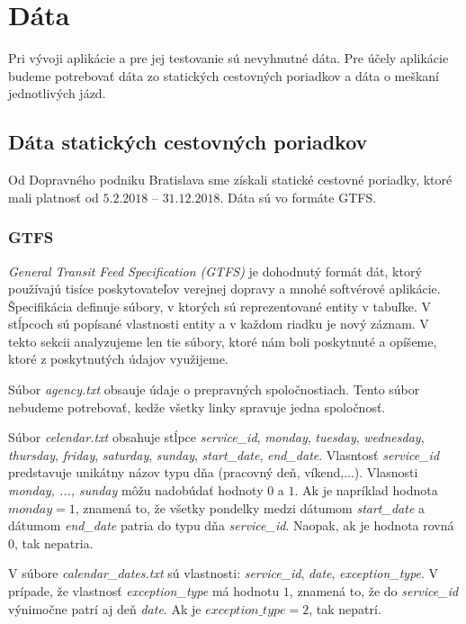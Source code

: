 \section{Dáta}
Pri vývoji aplikácie a pre jej testovanie sú nevyhnutné dáta. Pre účely aplikácie budeme potrebovať dáta zo statických cestovných poriadkov a dáta o meškaní jednotlivých jázd. 

\subsection{Dáta statických cestovných poriadkov}
Od Dopravného podniku Bratislava sme získali statické cestovné poriadky, ktoré mali platnosť od $5.2.2018$ – $31.12.2018$. Dáta sú vo formáte GTFS. 

\subsubsection{GTFS}
\label{sec:gtfs}
\textit{General Transit Feed Specification (GTFS)} je dohodnutý formát dát, ktorý používajú tisíce poskytovateľov verejnej dopravy a mnohé softvérové aplikácie. Špecifikácia definuje súbory, v ktorých sú reprezentované entity v tabuľke. V stĺpcoch sú popísané vlastnosti entity a v každom riadku je nový záznam. V tekto sekcii analyzujeme len tie súbory, ktoré nám boli poskytnuté a opíšeme, ktoré z poskytnutých údajov využijeme.

Súbor \textit{agency.txt} obsauje údaje o prepravných spoločnostiach. Tento súbor nebudeme potrebovať, kedže všetky linky spravuje jedna spoločnosť. 

Súbor \textit{celendar.txt} obsahuje stĺpce \textit{service\_id}, \textit{monday}, \textit{tuesday}, \textit{wednesday}, \textit{thursday}, \textit{friday}, \textit{saturday}, \textit{sunday}, \textit{start\_date}, \textit{end\_date}. Vlasntosť \textit{service\_id} predstavuje unikátny názov typu dňa (pracovný deň, víkend,...). Vlasnosti \textit{monday, ..., sunday} môžu nadobúdať hodnoty $0$ a $1$. Ak je napríklad hodnota $monday = 1$, znamená to, že všetky pondelky medzi dátumom \textit{start\_date} a dátumom \textit{end\_date} patria do typu dňa \textit{service\_id}. Naopak, ak je hodnota rovná $0$, tak nepatria. 

V súbore \textit{calendar\_dates.txt} sú vlastnosti: \textit{service\_id}, \textit{date}, \textit{exception\_type}. V prípade, že vlastnosť \textit{exception\_type} má hodnotu $1$, znamená to, že do \textit{service\_id} výnimočne patrí aj deň \textit{date}. Ak je $exception\_type = 2$, tak nepatrí.

